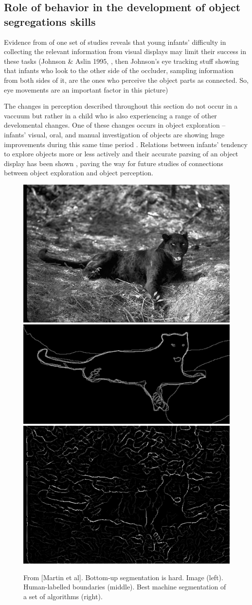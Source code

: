 \subsection{Role of behavior in the development of object segregations skills}

Evidence from of one set of studies reveals that young
infants' difficulty in collecting the relevant information
from visual displays may limit their success in these tasks (Johnson \&
Aslin 1995, \cite{johnson96perception}, then Johnson's eye tracking stuff
\cite{johnson04where} showing
that infants who look to the other side of the occluder, sampling
information from both sides of it, are the ones who perceive the
object parts as connected.  So, eye movements are an important factor
in this picture)

The changes in perception described throughout this section
do not occur in a vaccuum but rather in a
child who is also experiencing a range of other develomental changes.
One of these changes occurs in object
exploration -- infants' visual, oral, and manual
investigation of objects are showing huge improvements during this
same time period \cite{rochat89object}.  Relations between infants'
tendency to explore objects more or less actively and their accurate
parsing of an object display has been shown \cite{needham00improvements}, paving
the way for future studies of connections between object exploration
and object perception.





\begin{figure}[t]

\centerline{
\includegraphics[width=0.3\columnwidth]{cat}
\includegraphics[width=0.3\columnwidth]{cat-human}
\includegraphics[width=0.3\columnwidth]{cat-machine}
}

\caption{
From [Martin et al].  Bottom-up segmentation is hard.
Image (left).  Human-labelled boundaries (middle).
Best machine segmentation of a set of algorithms (right).
}

\label{fig:segmentation-is-hard}

\end{figure}



